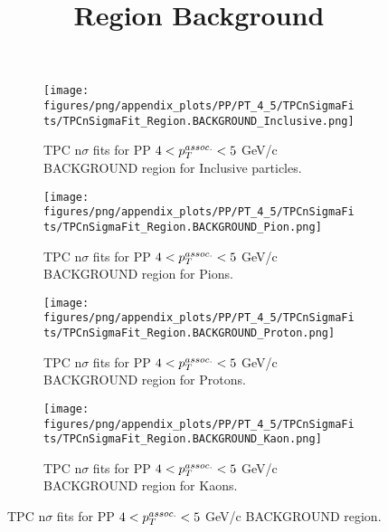             \begin{figure}[H]
                \title{Region Background}
                \begin{subfigure}[b]{0.5\textwidth}
                    \centering
                    \texttt{[image: figures/png/appendix\_plots/PP/PT\_4\_5/TPCnSigmaFits/TPCnSigmaFit\_Region.BACKGROUND\_Inclusive.png]}
                    \caption{TPC n$\sigma$ fits for PP $4 < \pTassoc < 5$ GeV/c BACKGROUND region for Inclusive particles.}
                    \label{fig:appendix_PP_$4 < \pTassoc < 5$ GeV/c_BACKGROUND_Inclusive}
                \end{subfigure}
                \begin{subfigure}[b]{0.5\textwidth}
                    \centering
                    \texttt{[image: figures/png/appendix\_plots/PP/PT\_4\_5/TPCnSigmaFits/TPCnSigmaFit\_Region.BACKGROUND\_Pion.png]}
                    \caption{TPC n$\sigma$ fits for PP $4 < \pTassoc < 5$ GeV/c BACKGROUND region for Pions.}
                    \label{fig:appendix_PP_$4 < \pTassoc < 5$ GeV/c_BACKGROUND_Pion}
                \end{subfigure}
                \begin{subfigure}[b]{0.5\textwidth}
                    \centering
                    \texttt{[image: figures/png/appendix\_plots/PP/PT\_4\_5/TPCnSigmaFits/TPCnSigmaFit\_Region.BACKGROUND\_Proton.png]}
                    \caption{TPC n$\sigma$ fits for PP $4 < \pTassoc < 5$ GeV/c BACKGROUND region for Protons.}
                    \label{fig:appendix_PP_$4 < \pTassoc < 5$ GeV/c_BACKGROUND_Proton}
                \end{subfigure}
                \begin{subfigure}[b]{0.5\textwidth}
                    \centering
                    \texttt{[image: figures/png/appendix\_plots/PP/PT\_4\_5/TPCnSigmaFits/TPCnSigmaFit\_Region.BACKGROUND\_Kaon.png]}
                    \caption{TPC n$\sigma$ fits for PP $4 < \pTassoc < 5$ GeV/c BACKGROUND region for Kaons.}
                    \label{fig:appendix_PP_$4 < \pTassoc < 5$ GeV/c_BACKGROUND_Kaon}
                \end{subfigure}
                \caption{TPC n$\sigma$ fits for PP $4 < \pTassoc < 5$ GeV/c BACKGROUND region.}
                \label{fig:appendix_PP_$4 < \pTassoc < 5$ GeV/c_BACKGROUND}
            \end{figure}
            \clearpage
            
